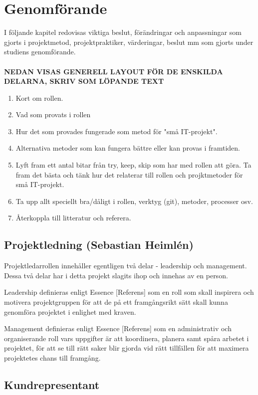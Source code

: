 \documentclass[conference,a4paper]{IEEEtran}
\begin{document}
\section{Genomförande} \label{sec:genom}
I följande kapitel redovisas viktiga beslut, förändringar och anpassningar som gjorts i projektmetod, projektpraktiker, värderingar, beslut mm som gjorts under studiens genomförande.\\
\\
\textbf{NEDAN VISAS GENERELL LAYOUT FÖR DE ENSKILDA DELARNA, SKRIV SOM LÖPANDE TEXT}
\begin{enumerate}
\item Kort om rollen.
\item Vad som provats i rollen
\item Hur det som provades fungerade som metod för "små IT-projekt".
\item Alternativa metoder som kan fungera bättre eller kan provas i framtiden.
\item Lyft fram ett antal bitar från try, keep, skip som har med rollen att göra. Ta fram det bästa och tänk hur det relaterar till rollen och projktmetoder för små IT-projekt.
\item Ta upp allt speciellt bra/dåligt i rollen, verktyg (git), metoder, processer osv.
\item Återkoppla till litteratur och referera.
\end{enumerate}

\subsection{Projektledning (Sebastian Heimlén)}
Projektledarrollen innehåller egentligen två delar - leadership och management. Dessa två delar har i detta projekt slagits ihop och innehas av en person.

Leadership definieras enligt Essence [Referens] som en roll som skall inspirera och motivera projektgruppen för att de på ett framgångsrikt sätt skall kunna genomföra projektet i enlighet med kraven.

Management definieras enligt Essence [Referens] som en administrativ och organiserande roll vars uppgifter är att koordinera, planera samt spåra arbetet i projektet, för att se till rätt saker blir gjorda vid rätt tillfällen för att maximera projektetes chans till framgång.


\subsection{Kundrepresentant}
\end{document}
